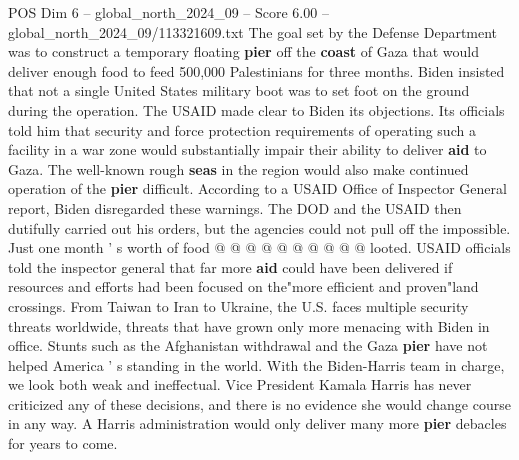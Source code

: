 \begin{textsample}{POS Dim 6 – global\_north\_2024\_09 – Score 6.00 – global\_north\_2024\_09/113321609.txt}
The goal set by the Defense Department was to construct a temporary floating \textbf{pier} off the \textbf{coast} of Gaza that would deliver enough food to feed 500,000 Palestinians for three months.
Biden insisted that not a single United States military boot was to set foot on the ground during the operation.
The USAID made clear to Biden its objections.
Its officials told him that security and force protection requirements of operating such a facility in a war zone would substantially impair their ability to deliver \textbf{aid} to Gaza.
The well-known rough \textbf{seas} in the region would also make continued operation of the \textbf{pier} difficult.
According to a USAID Office of Inspector General report, Biden disregarded these warnings.
The DOD and the USAID then dutifully carried out his orders, but the agencies could not pull off the impossible.
Just one month ' s worth of food @ @ @ @ @ @ @ @ @ @ looted.
USAID officials told the inspector general that far more \textbf{aid} could have been delivered if resources and efforts had been focused on the"more efficient and proven"land crossings.
From Taiwan to Iran to Ukraine, the U.S. faces multiple security threats worldwide, threats that have grown only more menacing with Biden in office.
Stunts such as the Afghanistan withdrawal and the Gaza \textbf{pier} have not helped America ' s standing in the world.
With the Biden-Harris team in charge, we look both weak and ineffectual.
Vice President Kamala Harris has never criticized any of these decisions, and there is no evidence she would change course in any way.
A Harris administration would only deliver many more \textbf{pier} debacles for years to come.

\end{textsample}
